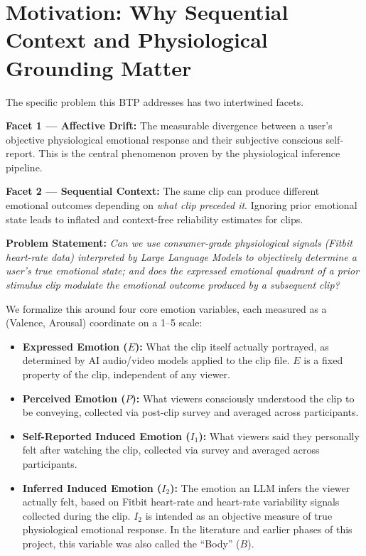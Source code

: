 \documentclass[11pt, a4paper]{report}
\begin{document}
\section{Motivation: Why Sequential Context and Physiological Grounding Matter}
\label{sec:intro-problem}

The specific problem this BTP addresses has two intertwined facets.

\textbf{Facet 1 --- Affective Drift:} The measurable divergence between a user's objective physiological emotional response and their subjective conscious self-report. This is the central phenomenon proven by the physiological inference pipeline.

\textbf{Facet 2 --- Sequential Context:} The same clip can produce different emotional outcomes depending on \textit{what clip preceded it}. Ignoring prior emotional state leads to inflated and context-free reliability estimates for clips.

\begin{center}
\end{center}

\textbf{Problem Statement:} \textit{Can we use consumer-grade physiological signals (Fitbit heart-rate data) interpreted by Large Language Models to objectively determine a user's true emotional state; and does the expressed emotional quadrant of a prior stimulus clip modulate the emotional outcome produced by a subsequent clip?}

We formalize this around four core emotion variables, each measured as a (Valence, Arousal) coordinate on a 1--5 scale:
\begin{itemize}
    \item \textbf{Expressed Emotion ($E$):} What the clip itself actually portrayed, as determined by AI audio/video models applied to the clip file. $E$ is a fixed property of the clip, independent of any viewer.
    \item \textbf{Perceived Emotion ($P$):} What viewers consciously understood the clip to be conveying, collected via post-clip survey and averaged across participants.
    \item \textbf{Self-Reported Induced Emotion ($I_1$):} What viewers said they personally felt after watching the clip, collected via survey and averaged across participants.
    \item \textbf{Inferred Induced Emotion ($I_2$):} The emotion an LLM infers the viewer actually felt, based on Fitbit heart-rate and heart-rate variability signals collected during the clip. $I_2$ is intended as an objective measure of true physiological emotional response. In the literature and earlier phases of this project, this variable was also called the ``Body'' ($B$).
\end{itemize}
\end{document}
